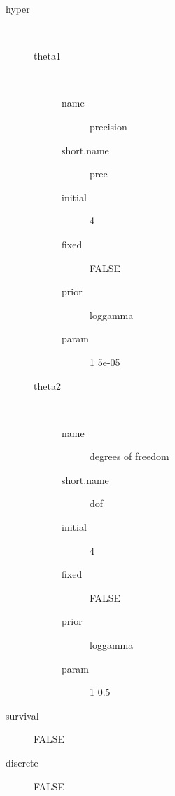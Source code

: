 \begin{description}
	\item[hyper]\ 
	 \begin{description}
	 	\item[theta1]\ 
	 	 \begin{description}
	 	 	 \item[ name ] precision 
	 	 	 \item[ short.name ] prec 
	 	 	 \item[ initial ] 4 
	 	 	 \item[ fixed ] FALSE 
	 	 	 \item[ prior ] loggamma 
	 	 	 \item[ param ] 1 5e-05 
	 	 \end{description}
	 	\item[theta2]\ 
	 	 \begin{description}
	 	 	 \item[ name ] degrees of freedom 
	 	 	 \item[ short.name ] dof 
	 	 	 \item[ initial ] 4 
	 	 	 \item[ fixed ] FALSE 
	 	 	 \item[ prior ] loggamma 
	 	 	 \item[ param ] 1 0.5 
	 	 \end{description}
	 \end{description}
	 \item[ survival ] FALSE 
	 \item[ discrete ] FALSE 
\end{description}
